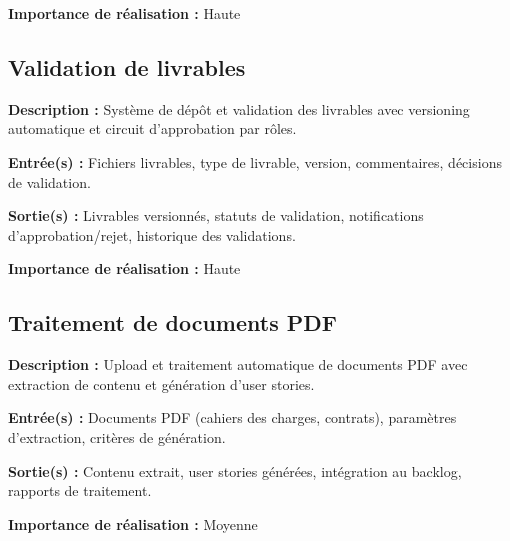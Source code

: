 \textbf{Importance de réalisation :} Haute

\subsection{Validation de livrables}
\textbf{Description :} Système de dépôt et validation des livrables avec versioning automatique et circuit d'approbation par rôles.

\textbf{Entrée(s) :} Fichiers livrables, type de livrable, version, commentaires, décisions de validation.

\textbf{Sortie(s) :} Livrables versionnés, statuts de validation, notifications d'approbation/rejet, historique des validations.

\textbf{Importance de réalisation :} Haute

\subsection{Traitement de documents PDF}
\textbf{Description :} Upload et traitement automatique de documents PDF avec extraction de contenu et génération d'user stories.

\textbf{Entrée(s) :} Documents PDF (cahiers des charges, contrats), paramètres d'extraction, critères de génération.

\textbf{Sortie(s) :} Contenu extrait, user stories générées, intégration au backlog, rapports de traitement.

\textbf{Importance de réalisation :} Moyenne
    
